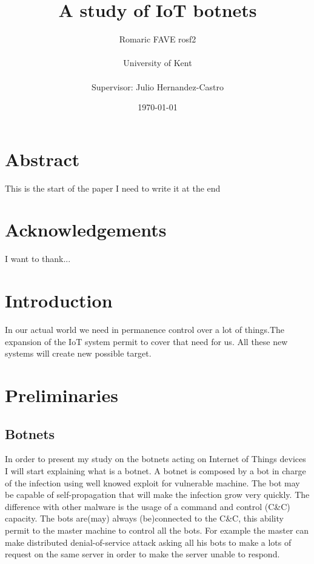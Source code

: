 \documentclass{report}
\date{\monthyeardate\today}
\begin{document}
\title{A study of IoT botnets}
\author{Romaric FAVE rosf2\\
  \\
  University of Kent\\
  \\
  Supervisor: Julio Hernandez-Castro
}

\maketitle

\tableofcontents

\chapter*{Abstract}
This is the start of the paper I need to write it at the end

\chapter*{Acknowledgements}
I want to thank...

\chapter{Introduction}
In our actual world we need in permanence control over a lot of things.The expansion of the IoT system permit to cover that need for us. All these new systems will create new possible target. 

\chapter{Preliminaries}
\section{Botnets}
In order to present my study on the botnets acting on Internet of Things devices I will start explaining what is a botnet. A botnet is composed by a bot in charge of the infection using well knowed exploit for vulnerable machine. The bot may be capable of self-propagation that will make the infection grow very quickly. The difference with other malware is the usage of a command and control (C\&C) capacity. The bots are(may) always (be)connected to the C\&C, this ability permit to the master machine to control all the bots. For example the master can make distributed denial-of-service attack asking all his bots to make a lots of request on the same server in order to make the server unable to respond.
\end{document}
